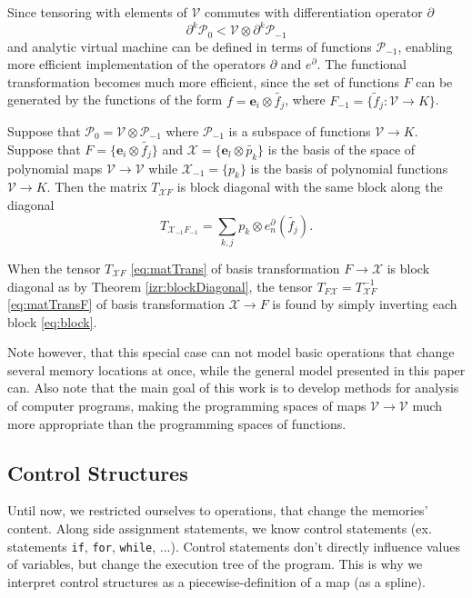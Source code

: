 \documentclass[11pt]{article}
\newcommand{\VV}{\mathcal{V}}
\newcommand{\e}{\mathbf{e}}
\newcommand{\X}{\mathcal{X}}
\newcommand{\dP}{\mathcal{P}}
\newcommand{\D}{\partial}
\begin{document}
Since tensoring with elements of $\VV$ commutes with differentiation operator $\D$
\begin{equation}
  \label{eq:dP0_dP-1}
  \D^k\dP_0 < \VV\otimes \D^k\dP_{-1}
\end{equation}
and analytic virtual machine can be defined in terms of functions $\dP_{-1}$,
enabling more efficient implementation of the operators $\D$ and $e^\D$. The
functional transformation becomes much more efficient, since the set of
functions $F$ can be generated by the functions of the form  $f=\e_i\otimes
\tilde{f_j}$, where $F_{-1}=\{\tilde{f}_j:\VV\to K \}$.
\begin{theorem}\label{izr:blockDiagonal}
Suppose that $\dP_0=\VV\otimes \dP_{-1}$ where $\dP_{-1}$ is a subspace of
functions $\VV\to K$. Suppose that $F=\{\e_i\otimes \tilde{f_j}\}$ and $\X=\{\e_l\otimes
\tilde{p_k}\}$ is the basis of the space of polynomial maps $\VV\to\VV$ while
$\X_{-1}=\{p_k\}$ is the basis of polynomial functions $\VV\to K$. Then the matrix $T_{\X F}$ is block diagonal with the same block along the diagonal
\begin{equation}
  \label{eq:block}
  T_{\X_{-1}F_{-1}} = \sum\limits_{k,j} p_k\otimes e^{\D}_n(\tilde{f_j}).
\end{equation}
\end{theorem}
\begin{corollary}
When the tensor $T_{\X F}$ \eqref{eq:matTrans} of basis transformation $F\to\X$ is block diagonal as by Theorem \ref{izr:blockDiagonal}, the tensor $T_{F\X}=T_{\X F}^{-1}$ \eqref{eq:matTransF} of basis transformation $\X\to F$ is found by simply inverting each block \eqref{eq:block}.
\end{corollary}
Note however, that this special case can not model basic operations that
change several memory locations at once, while the general model presented in this paper can. Also note that the main goal of this
work is to develop methods for analysis of computer programs, making the programming
spaces of maps $\VV\to \VV$ much more appropriate than the programming spaces of
functions.
 \subsection{Control Structures}\label{sec:control}
 
 Until now, we restricted ourselves to operations, that change the memories' content. Along side assignment statements, we know control statements (ex. statements \texttt{if},
  \texttt{for}, \texttt{while}, ...). Control statements don't directly
  influence values of variables, but change the execution tree of the program. This is why
  we interpret control structures as a piecewise-definition of a map (as a spline).
  
\end{document}

